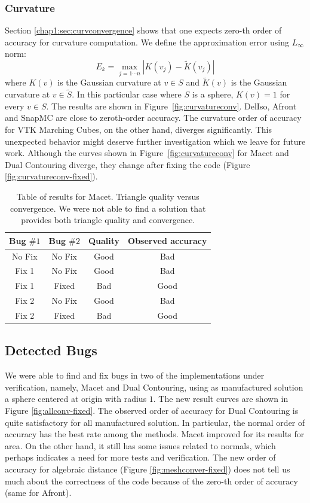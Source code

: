 \subsubsection{Curvature}

Section \ref{chap1:sec:curvconvergence} shows that one expects zero-th order of accuracy for 
curvature computation. 
We define the approximation error using $L_\infty$ norm:
\begin{equation}
E_{k} = \max_{j=1\cdots n}|K(v_j) - \tilde{K}(v_j)|
\label{eq:curverror}
\end{equation}
where $K(v)$ is the Gaussian curvature at $v \in S$ and $\tilde{K}(v)$ is the Gaussian curvature at $v \in \tilde{S}$. In this
particular case where $S$ is a sphere, $K(v) = 1$ for every $v \in S$. The results 
are shown in Figure~\ref{fig:curvatureconv}.
DelIso, Afront and SnapMC are close to zeroth-order accuracy. The
curvature order of accuracy for VTK Marching Cubes, on the other hand,
diverges significantly. This unexpected behavior might deserve further
investigation which we leave for future work.
Although the curves shown in Figure~\ref{fig:curvatureconv} for Macet and 
Dual Contouring diverge, they change after fixing the code 
(Figure \ref{fig:curvatureconv-fixed}).

\begin{table}
\centering
\begin{tabular}{cccc}
Bug $\#1$ & Bug $\#2$ & Quality & Observed accuracy \\

\hline
No Fix & No Fix & Good & Bad  \\
\hline
Fix 1 & No Fix & Good & Bad\\
Fix 1 & Fixed & Bad & Good\\
\hline
Fix 2 & No Fix & Good & Bad\\
Fix 2 & Fixed & Bad & Good\\
\hline
\end{tabular}
\caption{Table of results for Macet. Triangle quality versus 
convergence. We were not able to find a solution that provides 
both triangle quality and convergence.}
\label{tab:results-macet}
\end{table}

\subsection{Detected Bugs}

We were able to find and fix bugs in two of the implementations 
under verification, namely, Macet and Dual Contouring, using as  
manufactured solution a sphere centered at origin with radius $1$. 
The new result curves are shown in Figure \ref{fig:allconv-fixed}. The observed 
order of accuracy for Dual Contouring is quite satisfactory for all manufactured 
solution. In particular, the normal order of accuracy has the best rate among the 
methods. Macet improved for its results for area. On the other hand, it still has 
some issues related to normals, which perhaps indicates a need for more tests 
and verification. The new order of accuracy for algebraic 
distance (Figure \ref{fig:meshconver-fixed}) does not tell us 
much about the correctness of the code because of the zero-th order 
of accuracy (same for Afront). 


